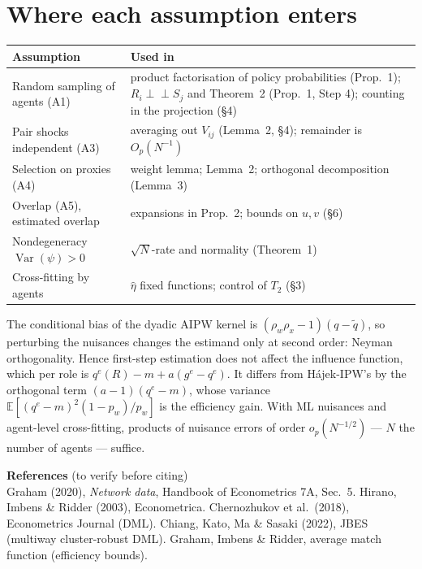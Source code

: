 \documentclass[11pt,a4paper]{article}
\theoremstyle{remark}
\newcommand{\E}{\mathbb{E}}
\newcommand{\Var}{\operatorname{Var}}
\newcommand{\1}{\mathbf{1}}
\newcommand{\ind}{\perp\!\!\!\perp}
\newcommand{\qe}{q^{e}}
\newcommand{\gE}{g^{e}}
\begin{document}
\section{Where each assumption enters}
\begin{center}
\begin{tabular}{@{}>{\raggedright\arraybackslash}p{4.2cm}>{\raggedright\arraybackslash}p{10.4cm}@{}}
\toprule
Assumption & Used in \\
\midrule
Random sampling of agents (A1) & product factorisation of policy probabilities (Prop.~1); $R_i\ind S_j$ and Theorem~2 (Prop.~1, Step 4); counting in the projection (\S4)\\
Pair shocks independent (A3) & averaging out $V_{ij}$ (Lemma~2, \S4); remainder is $O_p(N^{-1})$\\
Selection on proxies (A4) & weight lemma; Lemma~2; orthogonal decomposition (Lemma~3)\\
Overlap (A5), estimated overlap & expansions in Prop.~2; bounds on $u,v$ (\S6)\\
Nondegeneracy $\Var(\psi)>0$ & $\sqrt N$-rate and normality (Theorem~1)\\
Cross-fitting by agents & $\hat\eta$ fixed functions; control of $T_2$ (\S3)\\
\bottomrule
\end{tabular}
\end{center}

\begin{intuitionbox}
The conditional bias of the dyadic AIPW kernel is $(\rho_w\rho_x-1)(q-\tilde q)$, so perturbing the nuisances changes the estimand only at second order: Neyman orthogonality. Hence first-step estimation does not affect the influence function, which per role is $\qe(R)-m+a(\gE-\qe)$. It differs from Hájek-IPW's by the orthogonal term $(a-1)(\qe-m)$, whose variance $\E[(\qe-m)^2(1-p_w)/p_w]$ is the efficiency gain. With ML nuisances and agent-level cross-fitting, products of nuisance errors of order $o_p(N^{-1/2})$ --- $N$ the number of agents --- suffice.
\end{intuitionbox}

\vspace{0.5em}
\noindent\textbf{References} (to verify before citing)\\
Graham (2020), \emph{Network data}, Handbook of Econometrics 7A, Sec.~5.
Hirano, Imbens \& Ridder (2003), Econometrica.
Chernozhukov et al.\ (2018), Econometrics Journal (DML).
Chiang, Kato, Ma \& Sasaki (2022), JBES (multiway cluster-robust DML).
Graham, Imbens \& Ridder, average match function (efficiency bounds).
\end{document}
